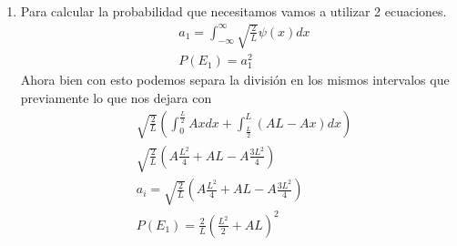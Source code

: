 \documentclass[12pt]{exam}
\begin{document}
\begin{enumerate}
\begin{enumerate}
\item Para calcular la probabilidad que necesitamos vamos a utilizar 2 ecuaciones.
	\begin{align}
		&a_1 = \int_{-\infty}^{\infty}\sqrt{\frac{2}{L}}\psi(x)dx\\
		&P(E_1) = a_1^2
	\end{align}
	Ahora bien con esto podemos separa la división en los mismos intervalos que previamente lo que nos dejara con
		\begin{align*}
			&\sqrt{\frac{2}{L}}\left(\int_0^{\frac{L}{2}}Ax dx + \int_{\frac{L}{2}}^L (AL - Ax)dx\right)\\
			&\sqrt{\frac{2}{L}}\left(A\frac{L^2}{4} + AL - A\frac{3L^2}{4}\right)\\
			&a_i = \sqrt{\frac{2}{L}}\left(A\frac{L^2}{4} + AL - A\frac{3L^2}{4}\right)\\
			&P(E_1) = \frac{2}{L}\left(\frac{L^2}{2}+AL\right)^2
		\end{align*}
\end{enumerate}
\end{enumerate}
\end{document}
